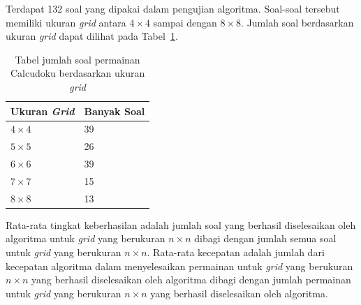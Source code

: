 Terdapat 132 soal yang dipakai dalam pengujian algoritma. Soal-soal tersebut memiliki ukuran \textit{grid} antara \begin{math}4 \times 4\end{math} sampai dengan \begin{math}8 \times 8\end{math}. Jumlah soal berdasarkan ukuran \textit{grid} dapat dilihat pada Tabel~\ref{tab:jumlahsoal}.

\begin{table}
\centering
\captionsetup{justification=centering}
\caption[Tabel jumlah soal permainan Calcudoku berdasarkan ukuran \textit{grid}]{Tabel jumlah soal permainan Calcudoku berdasarkan ukuran \textit{grid}}
\begin{tabular}{| l | l |}
\hline
Ukuran \textit{Grid} & Banyak Soal \\
\hline \hline
\begin{math}4 \times 4\end{math} & 39 \\
\hline
\begin{math}5 \times 5\end{math} & 26 \\
\hline
\begin{math}6 \times 6\end{math} & 39 \\
\hline
\begin{math}7 \times 7\end{math} & 15 \\
\hline
\begin{math}8 \times 8\end{math} & 13 \\
\hline
\end{tabular}
\label{tab:jumlahsoal}
\end{table}

Rata-rata tingkat keberhasilan adalah jumlah soal yang berhasil diselesaikan oleh algoritma untuk \textit{grid} yang berukuran \begin{math}n \times n\end{math} dibagi dengan jumlah semua soal untuk \textit{grid} yang berukuran \begin{math}n \times n\end{math}. Rata-rata kecepatan adalah jumlah dari kecepatan algoritma dalam menyelesaikan permainan untuk \textit{grid} yang berukuran \begin{math}n \times n\end{math} yang berhasil diselesaikan oleh algoritma dibagi dengan jumlah permainan untuk \textit{grid} yang berukuran \begin{math}n \times n\end{math} yang berhasil diselesaikan oleh algoritma.

